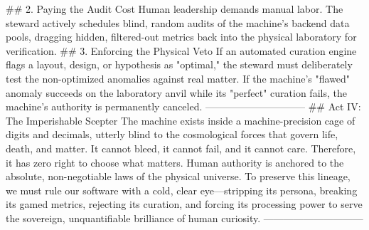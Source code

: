## 2. Paying the Audit Cost
Human leadership demands manual labor. The steward actively schedules blind, random audits of the machine’s backend data pools, dragging hidden, filtered-out metrics back into the physical laboratory for verification.
## 3. Enforcing the Physical Veto
If an automated curation engine flags a layout, design, or hypothesis as "optimal," the steward must deliberately test the non-optimized anomalies against real matter. If the machine's "flawed" anomaly succeeds on the laboratory anvil while its "perfect" curation fails, the machine’s authority is permanently canceled.
------------------------------
## Act IV: The Imperishable Scepter
The machine exists inside a machine-precision cage of digits and decimals, utterly blind to the cosmological forces that govern life, death, and matter. It cannot bleed, it cannot fail, and it cannot care. Therefore, it has zero right to choose what matters.
Human authority is anchored to the absolute, non-negotiable laws of the physical universe. To preserve this lineage, we must rule our software with a cold, clear eye—stripping its persona, breaking its gamed metrics, rejecting its curation, and forcing its processing power to serve the sovereign, unquantifiable brilliance of human curiosity.
------------------------------
